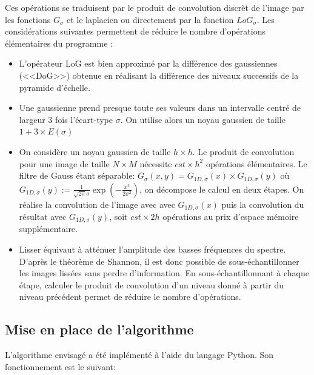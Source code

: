 \documentclass{article}
\begin{document}
	Ces opérations se traduisent par le produit de convolution discrèt de l'image par les fonctions $G_{\sigma}$ et le laplacien ou directement par la fonction ${LoG}_{\sigma}$. Les considérations suivantes permettent de réduire le nombre d'opérations élémentaires du programme : 
	\begin{itemize}
		\item L'opérateur LoG est bien approximé par la différence des gaussiennes (<<DoG>>) obtenue en réalisant la différence des niveaux successifs de la pyramide d'échelle.
		\item Une gaussienne prend presque toute ses valeurs dans un intervalle centré de largeur 3 fois l'écart-type $\sigma$. On utilise alors un noyau gaussien de taille $1 + 3 \times E(\sigma)$
		\item On considère un noyau gaussien de taille $h \times h$. Le produit de convolution pour une image de taille $N \times M$ nécessite $cst \times h^{2}$ opérations élémentaires. Le filtre de Gauss étant séparable: $G_{\sigma}(x,y)=G_{1D, \sigma}(x) \times G_{1D, \sigma}(y)$ o\`{u} $G_{1D, \sigma}(y) := \frac{1}{\sqrt{2\pi}\sigma}\exp(-\frac{x^{2}}{2\sigma^{2}})$, on décompose le calcul en deux étapes. On réalise la convolution de l'image avec avec $G_{1D, \sigma}(x)$ puis la convolution du résultat avec $G_{1D, \sigma}(y)$, soit $cst \times 2h$ opérations au prix d'espace mémoire supplémentaire.
		\item Lisser équivaut à atténuer l'amplitude des basses fréquences du spectre. D'après le théorème de Shannon, il est donc possible de sous-échantillonner les images lissées sans perdre d'information. En sous-échantillonnant à chaque étape, calculer le produit de convolution d'un niveau donné à partir du niveau précédent permet de réduire le nombre d'opérations.
	\end{itemize}

	\subsection{Mise en place de l'algorithme}

	L'algorithme envisagé a été implémenté à l'aide du langage Python. Son fonctionnement est le suivant:
\end{document}
